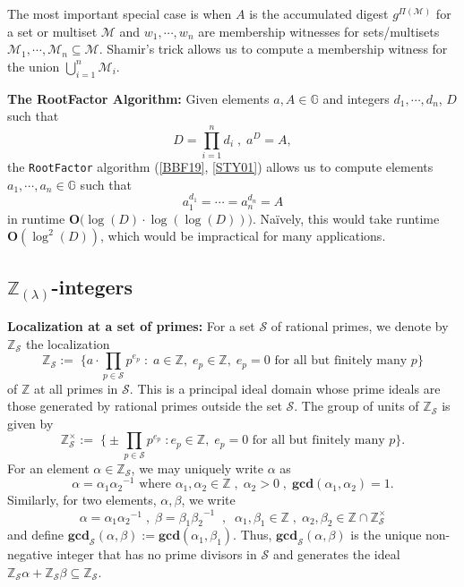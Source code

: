 \documentclass[11pt, lettersize, notitlepage, leqno, footskip=0.6cm]{article}
\newcommand{\bz}{\mathbb Z}
\newcommand{\pl}{\prod\limits}
\newcommand{\slim}{\sum\limits}
\newcommand{\bG}{\mathbb{G}}
\newcommand{\mc}{\mathcal}
\newcommand{\mb}{\mathbb}
\newcommand{\mbf}{\mathbf}
\newcommand{\al}{\alpha}
\newcommand{\be}{\beta}
\newcommand{\lamb}{\lambda}
\newcommand{\bzs}{\bz_{\mc{S}}}
\newcommand{\sub}{\subseteq}
\newcommand{\vs}{\vspace{-0.15cm}}
\newcommand{\noin}{\noindent}
\newcommand{\op}{overwhelming probability}
\newcommand{\LCM}{\mbf{lcm}}
\newcommand{\GCD}{\mbf{gcd}}
\numberwithin{equation}{section}
\begin{document}
The most important special case is when $A$ is the accumulated digest $g^{\Pi(\mc{M})}$ for a set or multiset $\mc{M}$ and $w_1,\cdots,w_n$ are membership witnesses for sets/multisets $\mc{M}_1,\cdots,\mc{M}_n\sub \mc{M}$. Shamir's trick allows us to compute a membership witness for the union $\bigcup\limits_{i=1}^n \mc{M}_i$. 

\begin{comment} Conversely, for any element $b = \pl_{i=1}^n a_i^{x_i}$ $(x_i\in\bz)$, we have \vs $$ b^{\LCM(d_1,\cdots,d_n)} = A^{\slim_{i=1}^n  \frac{\LCM(d_1,\cdots,d_n)x_i}{d_i}} $$ and the low order assumption implies that with \op, \vs $$b =  a^{\slim_{i=1}^n  \frac{\LCM(d_1,\cdots,d_n)x_i}{d_i}}.$$ Thus, $b$ is expressible as a power of $a$. 

\end{comment}

\vspace{0.2cm}


\noindent \textbf{The RootFactor Algorithm:} Given elements $a, A\in\mb{G}$ and integers $d_1,\cdots, d_n$, $D$ such that \vs $$D= \pl_{i=1}^n d_i\; ,\; a^{D} = A,$$ the {\tt{RootFactor}} algorithm (\hyperlink{BBF19}{[BBF19]}, \hyperlink{STY01}{[STY01]}) allows us to compute elements $a_1,\cdots, a_n\in \bG$ such that \vs $$a_1^{d_1}=\cdots = a_n^{d_n} = A$$ in runtime $\mbf{O}\big(\log(D)\cdot \log(\log(D))\big)$. Na\"ively, this would take runtime $\mbf{O}(\log^2(D))$, which would be impractical for many applications.


\subsection{\fontsize{11}{11}\selectfont $\bz_{(\lamb)}$-integers}


\noin \textbf{Localization at a set of primes:} For a set $\mc{S}$ of rational primes, we denote by $\bz_{\mc{S}}$ the localization \vs $$\bz_{\mc{S}}:= \;\Big\{a\cdot\pl_{p\in \mc{S}} p^{e_p}\;:\;a\in\bz,\; e_p\in \bz,\;e_p = 0 \text{ for all but finitely many } p\Big\} $$ of $\bz$ at all primes in $\mc{S}$. This is a principal ideal domain whose prime ideals are those generated by rational primes outside the set $\mc{S}$. The group of units of $\bzs$ is given by \vs $$\bzs^{\times}:= \;\Big\{\pm {\pl_{p\in \mc{S}} p^{e_p}}\;: e_p\in \bz,\;e_p = 0 \text{ for all but finitely many } p\Big\} .$$ For an element $\al\in \bz_{\mc{S}}$, we may uniquely write $\al$ as \vs $$\al = {\al_1}{\al_2}^{-1} \text{ where } \al_1,\al_2\in \bz\;,\; \al_2>0\;,\;\GCD(\al_1,\al_2) = 1.$$ 
Similarly, for two elements, $\al,\be$, we write \vs $$\al = \al_1{\al_2}^{-1}\;,\; \be = {\be_1}{\be_2}^{-1}\;\;,\;\;\al_1,\be_1\in\bz\;,\;\al_2,\be_2\in \bz\cap\bzs^{\times}$$ and define $\GCD_{\mc{S}}(\al,\be):= \GCD(\al_1,\be_1)$. Thus, $\GCD_{\mc{S}}(\al,\be)$ is the unique non-negative integer that has no prime divisors in $\mc{S}$ and generates the ideal $\bzs \al+\bzs\be\sub \bzs$.\vspace{0.1cm}
\end{document}
